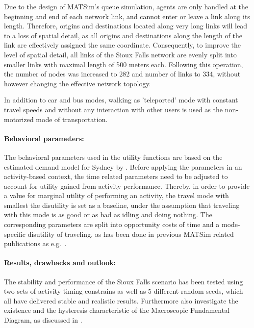 Due to the design of MATSim’s queue simulation, agents are only handled at the beginning and end of each network link, and cannot enter or leave a link along its length. Therefore, origins and destinations located along very long links will lead to a loss of spatial detail, as all origins and destinations along the length of the link are effectively assigned the same coordinate. Consequently, to improve the level of spatial detail, all links of the Sioux Falls network are evenly split into smaller links with maximal length of 500 meters each. Following this operation, the number of nodes was increased to 282 and number of links to 334, without however changing the effective network topology.

In addition to car and bus modes, walking as 'teleported' mode with constant travel speeds and without any interaction with other users is used as the non-motorized mode of transportation. 

\paragraph{Behavioral parameters:}

The behavioral parameters used in the utility functions are based on the estimated demand model for Sydney by \citet[][]{TirachiniHensherRose_TransResB_2014}. Before applying the parameters in an activity-based context, the time related parameters need to be adjusted to account for utility gained from activity performance. Thereby, in order to provide a value for marginal utility of performing an activity, the travel mode with smallest the disutility is set as a baseline, under the assumption that traveling with this mode is as good or as bad as idling and doing nothing. The corresponding parameters are split into opportunity costs of time and a mode-specific disutility of traveling, as has been done in previous MATSim related publications as e.g.\ \citet[][]{KickhoeferEtAl_Transportation_2011}. 

\paragraph{Results, drawbacks and outlook:}

The stability and performance of the Sioux Falls scenario has been tested using two sets of activity timing constrains as well as 5 different random seeds, which all have delivered stable and realistic results. Furthermore \citet[][]{ChakirovFourie_TechRep_FCL_2014} also investigate the existence and the hysteresis characteristic of the Macroscopic Fundamental Diagram, as discussed in \citet[][]{GeroliminisDaganzo_TRB_2007, GeroliminisDaganzo_TransResB_2008, GeroliminisSun_TransResA_2011}. 

